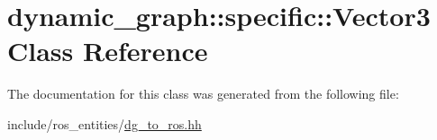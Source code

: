 \hypertarget{classdynamic__graph_1_1specific_1_1Vector3}{}\section{dynamic\+\_\+graph\+:\+:specific\+:\+:Vector3 Class Reference}
\label{classdynamic__graph_1_1specific_1_1Vector3}


The documentation for this class was generated from the following file\+:\begin{DoxyCompactItemize}
\item 
include/ros\+\_\+entities/\hyperlink{dg__to__ros_8hh}{dg\+\_\+to\+\_\+ros.\+hh}\end{DoxyCompactItemize}
